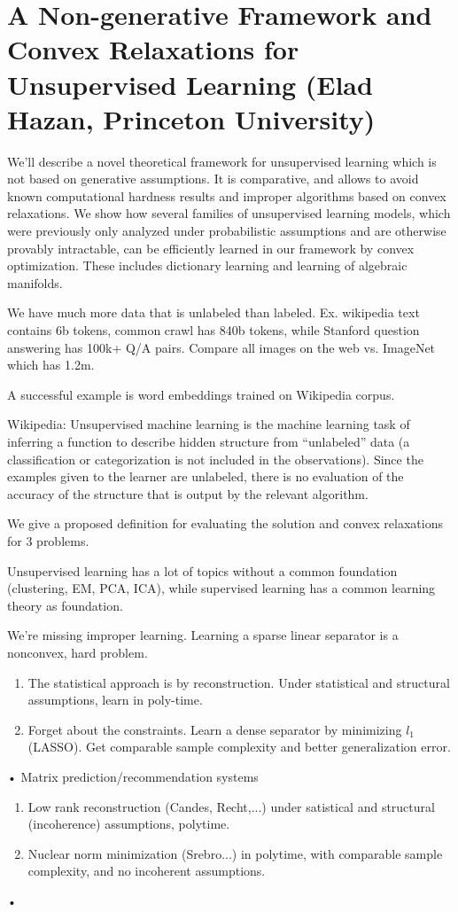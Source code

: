 \section{A Non-generative Framework and Convex Relaxations for Unsupervised Learning (Elad Hazan, Princeton University)}

We'll describe a novel theoretical framework for unsupervised learning which is not based on generative assumptions. It is comparative, and allows to avoid known computational hardness results and improper algorithms based on convex relaxations. We show how several families of unsupervised learning models, which were previously only analyzed under probabilistic assumptions and are otherwise provably intractable, can be efficiently learned in our framework by convex optimization. These includes dictionary learning and learning of algebraic manifolds.
 

We have much more data that is unlabeled than labeled. Ex. wikipedia text contains 6b tokens, common crawl has 840b tokens, while Stanford question answering has 100k+ Q/A pairs. Compare all images on the web vs. ImageNet which has 1.2m.

A successful example is word embeddings trained on Wikipedia corpus.

Wikipedia: 
Unsupervised machine learning is the machine learning task of inferring a function to describe hidden structure from ``unlabeled'' data (a classification or categorization is not included in the observations). Since the examples given to the learner are unlabeled, there is no evaluation of the accuracy of the structure that is output by the relevant algorithm.
 
We give a proposed definition for evaluating the solution and convex relaxations for 3 problems.

Unsupervised learning has a lot of topics without a common foundation (clustering, EM, PCA, ICA), while supervised learning has a common learning theory as foundation.

We're missing improper learning. Learning a sparse linear separator is a nonconvex, hard problem. 
\begin{enumerate}
\item
The statistical approach is by reconstruction. Under statistical and structural assumptions, learn in poly-time.

\item
Forget about the constraints. Learn a dense separator by minimizing $l_1$ (LASSO).  Get comparable sample complexity and better generalization error. 
\end{enumerate}•
Matrix prediction/recommendation systems
\begin{enumerate}
\item
Low rank reconstruction (Candes, Recht,...) under satistical and structural (incoherence) assumptions, polytime.
\item
Nuclear norm minimization (Srebro...) in polytime, with comparable sample complexity, and no incoherent assumptions.
\end{enumerate}•


